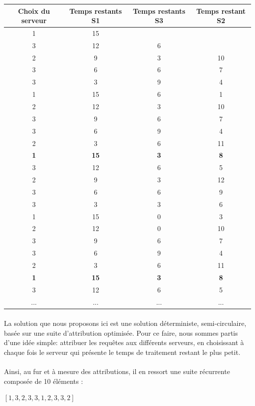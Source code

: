 \documentclass{article}
\begin{document}
\begin{tabular}{c|ccc}
	\hline \hline
	Choix du serveur & Temps restants S1 & Temps restants S3 & Temps restant S2 \\
	\hline 
	1 & 15 \\
	3 & 12 & 6 \\
	2 & 9 & 3 & 10 \\
	3 & 6 & 6 & 7 \\
	3 & 3 & 9 & 4 \\
	1 & 15 & 6 & 1 \\
	2 & 12 & 3 & 10 \\
	3 & 9 & 6 & 7 \\
	3 & 6 & 9 & 4 \\
	2 & 3 & 6 & 11 \\
	\hline
	\textbf{1} & \textbf{15} & \textbf{3} & \textbf{8} \\
	3 & 12 & 6 & 5 \\
	2 & 9 & 3 & 12 \\
	3 & 6 & 6 & 9 \\
	3 & 3 & 3 & 6 \\
	1 & 15 & 0 & 3 \\
	2 & 12 & 0 & 10 \\
	3 & 9 & 6 & 7 \\
	3 & 6 & 9 & 4 \\
	2 & 3 & 6 & 11 \\
	\hline
	\textbf{1} & \textbf{15} & \textbf{3} & \textbf{8} \\
	3 & 12 & 6 & 5 \\
	... & ... & ... & ... \\
	\hline \hline
\end{tabular}

\paragraph{}
La solution que nous proposons ici est une solution déterministe, semi-circulaire, basée sur une suite d'attribution optimisée.
Pour ce faire, nous sommes partis d'une idée simple: attribuer les requêtes aux différents serveurs, en choisissant à chaque fois le serveur qui présente le temps de traitement restant le plus petit.
\paragraph{}
Ainsi, au fur et à mesure des attributions, il en ressort une suite récurrente composée de 10 éléments :
\begin{center}
	$[1,3,2,3,3,1,2,3,3,2]$
\end{center}
\end{document}
